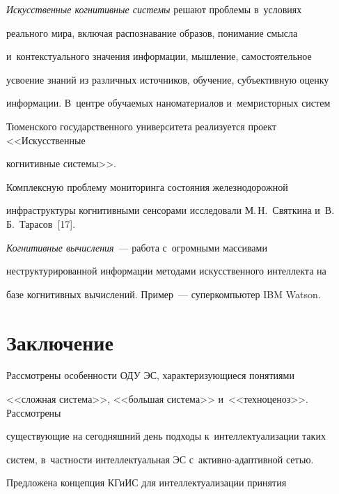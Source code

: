   


  \textit{Искусственные когнитивные системы} решают проблемы в~условиях 


реального мира, включая распознавание образов, понимание смысла 


и~контекстуального значения информации, мышление, самостоятельное 


усвоение знаний из различных источников, обучение, субъективную оценку 


информации. В~центре обуча\-емых наноматериалов и~мемристорных систем 


Тюменского государственного университета реализуется проект <<Искусственные 


когнитивные системы>>.   


Комплексную проблему мониторинга состояния железнодорожной 


инфраструктуры когнитивными сенсорами исследовали М.\,Н.~Святкина и~В.\,Б.~Тарасов~[17]. 


{





}





  


  \textit{Когнитивные вычисления}~--- работа с~огромными массивами 


неструктурированной информации методами искусственного интеллекта на 


базе когнитивных вычислений. Пример~--- суперкомпьютер IBM Watson. 


  


  \section{Заключение}


  


  Рассмотрены особенности ОДУ ЭС, характеризующиеся понятиями 


<<сложная система>>, <<большая система>> и~<<техноценоз>>. Рассмотрены 


существующие на сегодняшний день подходы к~интеллектуализации таких 


систем, в~част\-ности интеллектуальная ЭС с~ак\-тив\-но-адап\-тив\-ной сетью. 


Предложена концепция КГиИС для интеллектуализации принятия  


